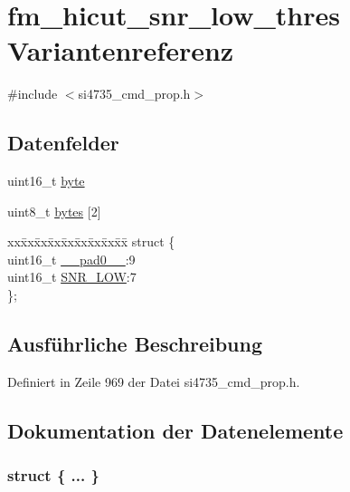 \hypertarget{unionfm__hicut__snr__low__thres}{}\section{fm\+\_\+hicut\+\_\+snr\+\_\+low\+\_\+thres Variantenreferenz}
\label{unionfm__hicut__snr__low__thres}


{\ttfamily \#include $<$si4735\+\_\+cmd\+\_\+prop.\+h$>$}

\subsection*{Datenfelder}
\begin{DoxyCompactItemize}
\item 
uint16\+\_\+t \hyperlink{unionfm__hicut__snr__low__thres_ab0549c1b5ea980a02e7eab77e21fea49}{byte}
\item 
uint8\+\_\+t \hyperlink{unionfm__hicut__snr__low__thres_a46e4c05d20a047ec169f60d3167e912e}{bytes} \mbox{[}2\mbox{]}
\item 
\begin{tabbing}
xx\=xx\=xx\=xx\=xx\=xx\=xx\=xx\=xx\=\kill
struct \{\\
\>uint16\_t \hyperlink{unionfm__hicut__snr__low__thres_a77132c2c26a75f5b8751b235cda23828}{\_\_pad0\_\_}:9\\
\>uint16\_t \hyperlink{unionfm__hicut__snr__low__thres_a085d572271ee279f8aa41b68466f752c}{SNR\_LOW}:7\\
\}; \\

\end{tabbing}\end{DoxyCompactItemize}


\subsection{Ausführliche Beschreibung}


Definiert in Zeile 969 der Datei si4735\+\_\+cmd\+\_\+prop.\+h.



\subsection{Dokumentation der Datenelemente}
\hypertarget{unionfm__hicut__snr__low__thres_aadb75b7965ed50c3ca66103f83d87a83}{}\subsubsection[{"@119}]{\setlength{\rightskip}{0pt plus 5cm}struct \{ ... \} }\label{unionfm__hicut__snr__low__thres_aadb75b7965ed50c3ca66103f83d87a83}
\hypertarget{unionfm__hicut__snr__low__thres_a77132c2c26a75f5b8751b235cda23828}{}
